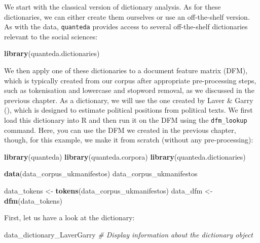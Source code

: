 \documentclass[
]{book}
\newenvironment{Shaded}{\begin{snugshade}}{\end{snugshade}}
\newcommand{\CommentTok}[1]{\textcolor[rgb]{0.56,0.35,0.01}{\textit{#1}}}
\newcommand{\FunctionTok}[1]{\textcolor[rgb]{0.13,0.29,0.53}{\textbf{#1}}}
\newcommand{\NormalTok}[1]{#1}
\newcommand{\OtherTok}[1]{\textcolor[rgb]{0.56,0.35,0.01}{#1}}
\begin{document}
We start with the classical version of dictionary analysis. As for these dictionaries, we can either create them ourselves or use an off-the-shelf version. As with the data, \texttt{quanteda} provides access to several off-the-shelf dictionaries relevant to the social sciences:

\begin{Shaded}
\begin{Highlighting}[]
\FunctionTok{library}\NormalTok{(quanteda.dictionaries)}
\end{Highlighting}
\end{Shaded}

We then apply one of these dictionaries to a document feature matrix (DFM), which is typically created from our corpus after appropriate pre-processing steps, such as tokenisation and lowercase and stopword removal, as we discussed in the previous chapter. As a dictionary, we will use the one created by Laver \& Garry (), which is designed to estimate political positions from political texts. We first load this dictionary into R and then run it on the DFM using the \texttt{dfm\_lookup} command. Here, you can use the DFM we created in the previous chapter, though, for this example, we make it from scratch (without any pre-processing):

\begin{Shaded}
\begin{Highlighting}[]
\FunctionTok{library}\NormalTok{(quanteda)}
\FunctionTok{library}\NormalTok{(quanteda.corpora)}
\FunctionTok{library}\NormalTok{(quanteda.dictionaries)}

\FunctionTok{data}\NormalTok{(data\_corpus\_ukmanifestos)}
\NormalTok{data\_corpus\_ukmanifestos}

\NormalTok{data\_tokens }\OtherTok{\textless{}{-}} \FunctionTok{tokens}\NormalTok{(data\_corpus\_ukmanifestos)}
\NormalTok{data\_dfm }\OtherTok{\textless{}{-}} \FunctionTok{dfm}\NormalTok{(data\_tokens)}
\end{Highlighting}
\end{Shaded}

First, let us have a look at the dictionary:

\begin{Shaded}
\begin{Highlighting}[]
\NormalTok{data\_dictionary\_LaverGarry  }\CommentTok{\# Display information about the dictionary object}
\end{Highlighting}
\end{Shaded}
\end{document}
